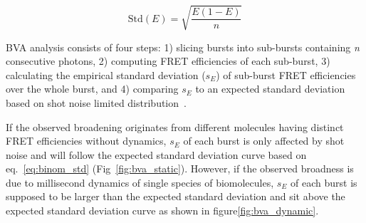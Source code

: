 \begin{equation}
\label{eq:binom_std}
\operatorname{Std(\textit{E})} = {\sqrt{\frac{E(1 - E)}{n}}}
\end{equation}

BVA analysis consists of four steps: 1) slicing bursts into sub-bursts containing \textit{n} consecutive photons, 2) computing FRET efficiencies of each sub-burst, 3) calculating the empirical standard deviation ($s_E$) of sub-burst FRET efficiencies over the whole burst, and 4) comparing $s_E$ to an expected standard deviation based on shot noise limited distribution~\cite{Torella_2011}. 

If the observed broadening originates from different molecules having distinct FRET efficiencies without dynamics, $s_E$ of each burst is only affected by shot noise and will follow the expected standard deviation curve based on eq.~\ref{eq:binom_std} (Fig~\ref{fig:bva_static}). However, if the observed broadness is due to millisecond dynamics of single species of biomolecules, $s_E$ of each burst is supposed to be larger than the expected standard deviation and sit above the expected standard deviation curve as shown in figure\ref{fig:bva_dynamic}.
